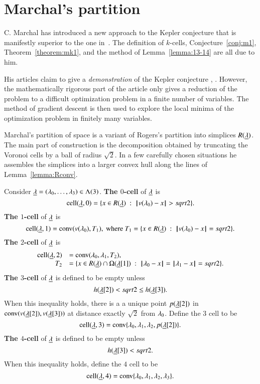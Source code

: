 \section{Marchal's partition}

C. Marchal has introduced a new approach to the Kepler conjecture that is manifestly superior to the one in~\cite{Hales:2006:DCG}.  The definition of $k$-cells, Conjecture~\ref{conj:m1}, Theorem~\ref{theorem:mk1}, and the method of Lemma~\ref{lemma:13-14} are all due to him.

His articles claim to give
a {\it demonstration} of the Kepler conjecture \cite{marchal:2007}, \cite{marchal:2008}.  However, the
mathematically rigorous part of the article only gives a reduction
of the problem to a difficult optimization problem in a finite number of
variables.  The method of gradient descent is then used to explore
the local minima of the optimization problem in finitely many variables.

Marchal's partition of space is a variant of Rogers's partition into simplices
$R({\underline{\lambda}})$.  The main part of construction is 
the decomposition obtained by truncating the Voronoi cells
by a ball of radius $\sqrt2$.  In a few carefully chosen situations he assembles the simplices
into a larger convex hull along the lines of Lemma~\ref{lemma:Rconv}.



\begin{definition} Consider ${\underline{\lambda}}=(\lambda_0,\ldots,\lambda_3)\in \Lambda(3)$.
\hfill\break\smallskip  
{\bf The $0$-cell} of ${\underline{\lambda}}$ is
$$
\operatorname{cell}({\underline{\lambda}},0) = \{x\in R({\underline{\lambda}}) \ :\  {\hskip0.1em|\hskip-0.15em|\hskip0.1em}v(\lambda_0) - x{\hskip0.1em|\hskip-0.15em|\hskip0.1em} > sqrt2\}.
$$
\bigskip
{\bf The $1$-cell} of ${\underline{\lambda}}$ is 
$$
\operatorname{cell}({\underline{\lambda}},1) = {\operatorname{conv}}(v(\lambda_0),T_1),\hbox{ where } T_1 = \{x \in R({\underline{\lambda}}) \ :\  {\hskip0.1em|\hskip-0.15em|\hskip0.1em}v(\lambda_0) - x{\hskip0.1em|\hskip-0.15em|\hskip0.1em}= sqrt2\}.
$$
\bigskip
{\bf The $2$-cell} of ${\underline{\lambda}}$ is
$$
\begin{array}{rll}
\operatorname{cell}({\underline{\lambda}},2) &= {\operatorname{conv}}(\lambda_0,\lambda_1,T_2),\quad \\
  T_2 &= \{x \in R({\underline{\lambda}})\cap \Omega({\underline{\lambda}}[1]) \ :\  {\hskip0.1em|\hskip-0.15em|\hskip0.1em}\lambda_0 - x{\hskip0.1em|\hskip-0.15em|\hskip0.1em}={\hskip0.1em|\hskip-0.15em|\hskip0.1em}\lambda_1 - x{\hskip0.1em|\hskip-0.15em|\hskip0.1em} =sqrt2\}.
\end{array}
$$
\bigskip
{\bf The $3$-cell} of ${\underline{\lambda}}$ is defined to be empty unless 
$$
h({\underline{\lambda}}[2]) <sqrt2 \le h({\underline{\lambda}}[3]).
$$
When this inequality holds,
there is a a unique point $p({\underline{\lambda}}[2])$ in
${\operatorname{conv}}(v({\underline{\lambda}}[2]),v({\underline{\lambda}}[3]))$ at distance exactly $\sqrt2$ from $\lambda_0$.  
Define the $3$ cell to be
$$
\operatorname{cell}({\underline{\lambda}},3) = {\operatorname{conv}}\{\lambda_0,\lambda_1,\lambda_2,p({\underline{\lambda}}[2])\}.
$$
\bigskip
{\bf The $4$-cell} of ${\underline{\lambda}}$ is defined to be empty unless
$$
h({\underline{\lambda}}[3]) <sqrt2.
$$
When this inequality holds, define the $4$ cell to be
$$
\operatorname{cell}({\underline{\lambda}},4) = {\operatorname{conv}}\{\lambda_0,\lambda_1,\lambda_2,\lambda_3\}.
$$
\end{definition}

